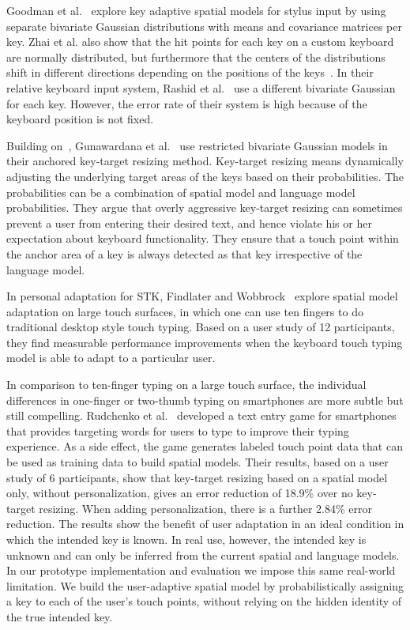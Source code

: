 \documentclass{sigchi}
\begin{document}
Goodman et al.~\cite{Goodman:2002} explore key adaptive spatial models for
stylus input by using separate bivariate Gaussian distributions with means and
covariance matrices per key. Zhai et al. also show that the hit points for each key on a custom keyboard~\cite{Zhai:2000} are normally distributed, but furthermore that the centers of the distributions shift in different directions depending on the positions of
the keys~\cite{Zhai:2002}. In their relative keyboard input system, Rashid et al.~\cite{Rashid:2008} use a different bivariate Gaussian for each key. However, the error rate of their system is high because of the keyboard position is not fixed.

Building on~\cite{Goodman:2002}, Gunawardana et al.~\cite{Gunawardana:2010} use restricted bivariate Gaussian
models in their anchored key-target resizing method. Key-target resizing means dynamically
adjusting the underlying target areas of the keys based on their probabilities. The probabilities can 
be a combination of spatial model and language model probabilities.
They argue that overly aggressive
key-target resizing can sometimes prevent a user from entering their desired text, and hence violate
his or her expectation about keyboard functionality. They ensure that a touch point within
the anchor area of a key is always detected as that key irrespective of the language model.

In personal adaptation for STK, Findlater and
Wobbrock~\cite{Findlater:2012} explore spatial model adaptation on large touch 
surfaces, in which one can use ten fingers to do traditional desktop style touch 
typing. Based on a user study of 12 participants, they find measurable
performance improvements when the keyboard touch typing model is able to adapt to a particular user. 

In comparison to ten-finger typing on a large touch surface, the individual 
differences in one-finger or two-thumb typing on smartphones are more subtle but
still compelling. Rudchenko et al.~\cite{Rudchenko:2011} developed a text entry 
game for smartphones that provides targeting words for users to type to improve 
their typing experience. As a side effect, the game generates labeled touch 
point data that can be used as training data to build spatial models.
Their results, based on a user study of 6 participants, show that key-target
resizing based on a spatial model only, without personalization, gives an error reduction of 18.9\% over no key-target resizing. 
When adding personalization, there is a further 2.84\% error reduction.
The results show the benefit of user adaptation in an ideal condition
in which the intended key is known. In real use, however, the intended key is 
unknown and can only be inferred from the current spatial and language models. In our prototype implementation and evaluation we impose 
this same real-world limitation. We build the user-adaptive spatial model by 
probabilistically assigning a key to each of the user's touch points, without
relying on the hidden identity of the true intended key.
\end{document}
